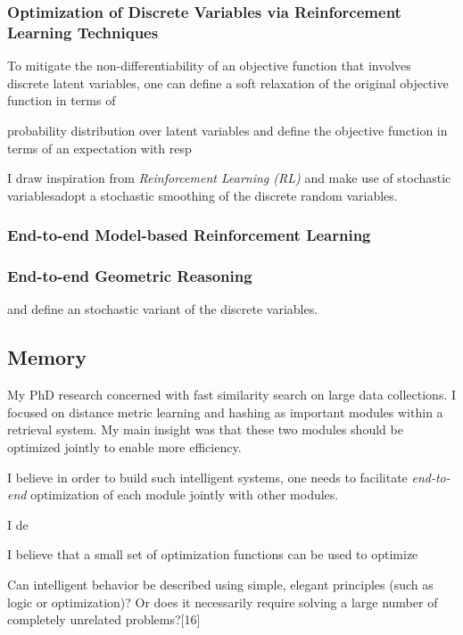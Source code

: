 \documentclass[a4paper, 10pt]{article}
\begin{document}
\subsubsection*{Optimization of Discrete Variables via Reinforcement Learning Techniques}

To mitigate the non-differentiability of an objective function that
involves discrete latent variables, one can define a soft relaxation
of the original objective function in terms of

probability
distribution over latent variables and define the objective function
in terms of an expectation with resp

I draw inspiration from {\em
  Reinforcement Learning (RL)} and make use of stochastic
variablesadopt a stochastic smoothing of the discrete random
variables.

\subsubsection*{End-to-end Model-based Reinforcement Learning}
\subsubsection*{End-to-end Geometric Reasoning}


and define an stochastic variant of the
discrete variables.

\subsection{Memory}

My PhD research concerned with fast similarity search on large data
collections. I focused on distance metric learning and hashing as
important modules within a retrieval system. My main insight was that
these two modules should be optimized jointly to enable more efficiency.


I believe in order to build such intelligent systems,
one needs to facilitate {\em end-to-end} optimization of each module
jointly with other modules.



I de

I believe that a small
set of optimization functions can be used to optimize 


Can intelligent behavior be described using simple, elegant principles
(such as logic or optimization)? Or does it necessarily require
solving a large number of completely unrelated problems?[16]
\end{document}
